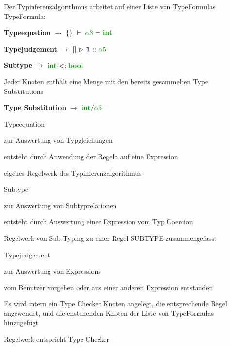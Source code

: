 { 
    \begin{itemgroup}{Der Typinferenzalgorithmus arbeitet auf einer Liste von TypeFormulas. \\[8mm] 
	TypeFormula:\\[-6mm]}
    
    \item \textbf{Typeequation} 	$\to$	$\SeenTypes{}\ \vdash\ \TypeEquationTypeInference
	{\TypeTypeVariable{\alpha3}} {\TypeIntegerType} $ 
    \item \textbf{Typejudgement} $\to$  	 $\TypeJudgement {\TypeEnvironment{}} {\ExprConstant{1}}
    	{\TypeTypeVariable{\alpha5}} $ 
    \item \textbf{Subtype}	$\to$	$\TypeSubType {\TypeIntegerType} {\TypeBooleanType} $  \\[-3mm]

    \end{itemgroup}

  \begin{itemgroup}{Jeder Knoten enthält eine Menge mit den bereits gesammelten Type Substitutions\\[-6mm]}
    \item \textbf{Type Substitution}	$\to$ $\TypeSubstitution{\TypeIntegerType}{\TypeTypeVariable{\alpha5}}$
  \end{itemgroup}
}

{ 
    \begin{itemgroup}{Typeequation}
     
	\item zur Auswertung von Typgleichungen
	\item entsteht durch Anwendung der Regeln auf eine Expression 
	\item eigenes Regelwerk des Typinferenzalgorithmus  \\
    \end{itemgroup}
    \begin{itemgroup}{Subtype}	
	\item zur Auswertung von Subtyprelationen
	\item entsteht durch Auswertung einer Expression vom Typ Coercion
	\item Regelwerk von Sub Typing zu einer Regel SUBTYPE zusammengefasst
     \end{itemgroup}
}

{ 
	\begin{itemgroup}{Typejudgement}
	\item zur Auswertung von Expressions 
	\item vom Benutzer vorgeben oder aus einer anderen Expression entstanden
	\item Es wird intern ein Type Checker Knoten angelegt, die entsprechende Regel angewendet,
	   und die enstehenden Knoten der Liste von TypeFormulas hinzugefügt
	\item Regelwerk entspricht Type Checker
     \end{itemgroup}
}